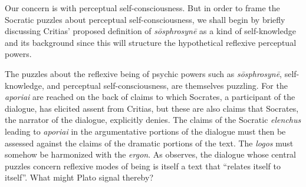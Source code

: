 

Our concern is with perceptual self-consciousness. But in order to frame the Socratic puzzles about perceptual self-consciousness, we shall begin by briefly discussing Critias' proposed definition of \emph{sōsphrosynē} as a kind of self-knowledge and its background since this will structure the hypothetical reflexive perceptual powers. 

The puzzles about the reflexive being of psychic powers such as \emph{sōsphrosynē}, self-knowledge, and perceptual self-consciousness, are themselves puzzling. For the \emph{aporiai} are reached on the back of claims to which Socrates, a participant of the dialogue, has elicited assent from Critias, but these are also claims that Socrates, the narrator of the dialogue, explicitly denies. The claims of the Socratic \emph{elenchus} leading to \emph{aporiai} in the argumentative portions of the dialogue must then be assessed against the claims of the dramatic portions of the text. The \emph{logos} must somehow be harmonized with the \emph{ergon}. As \citet{Schmid:1998aa} observes, the dialogue whose central puzzles concern reflexive modes of being is itself a text that ``relates itself to itself''. What might Plato signal thereby?

